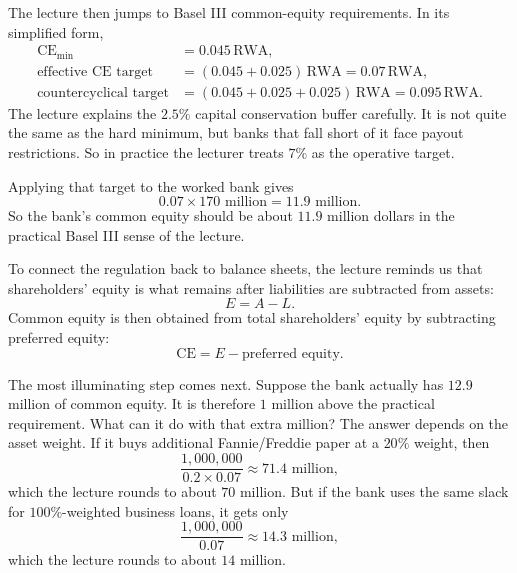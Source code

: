 The lecture then jumps to Basel III common-equity requirements. In its simplified form,
\begin{align}
\text{CE}_{\min} &= 0.045\,\text{RWA},\\
\text{effective CE target} &= (0.045 + 0.025)\,\text{RWA} = 0.07\,\text{RWA},\\
\text{countercyclical target} &= (0.045 + 0.025 + 0.025)\,\text{RWA} = 0.095\,\text{RWA}.
\end{align}
The lecture explains the \(2.5\%\) capital conservation buffer carefully. It is not quite the same as the hard minimum, but banks that fall short of it face payout restrictions. So in practice the lecturer treats \(7\%\) as the operative target.

Applying that target to the worked bank gives
\begin{equation}
0.07 \times 170\text{ million} = 11.9\text{ million}.
\end{equation}
So the bank's common equity should be about \(11.9\) million dollars in the practical Basel III sense of the lecture.

To connect the regulation back to balance sheets, the lecture reminds us that shareholders' equity is what remains after liabilities are subtracted from assets:
\begin{equation}
E = A - L.
\end{equation}
Common equity is then obtained from total shareholders' equity by subtracting preferred equity:
\begin{equation}
\text{CE} = E - \text{preferred equity}.
\end{equation}

The most illuminating step comes next. Suppose the bank actually has \(12.9\) million of common equity. It is therefore \(1\) million above the practical requirement. What can it do with that extra million? The answer depends on the asset weight. If it buys additional Fannie/Freddie paper at a \(20\%\) weight, then
\begin{equation}
\frac{1{,}000{,}000}{0.2 \times 0.07} \approx 71.4\text{ million},
\end{equation}
which the lecture rounds to about \(70\) million. But if the bank uses the same slack for \(100\%\)-weighted business loans, it gets only
\begin{equation}
\frac{1{,}000{,}000}{0.07} \approx 14.3\text{ million},
\end{equation}
which the lecture rounds to about \(14\) million.

